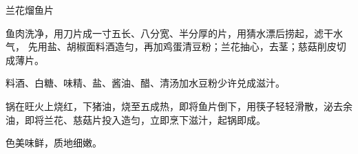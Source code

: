 \begin{recipe}{兰花熘鱼片}

\ingredients


\preparation

\step 鱼肉洗净，用刀片成一寸五长、八分宽、半分厚的片，用猜水漂后捞起，滤干水气，
先用盐、胡椒面料酒造匀，再加鸡蛋清豆粉；兰花抽心，去茎；慈菇削皮切成薄片。

\step 料酒、白糖、味精、盐、酱油、醋、清汤加水豆粉少许兑成滋汁。

\step 锅在旺火上烧红，下猪油，烧至五成热，即将鱼片倒下，用筷子轻轻滑散，泌去余
油，即将兰花、慈菇片投入造匀，立即烹下滋汁，起锅即成。

\features

色美味鲜，质地细嫩。

\end{recipe}

